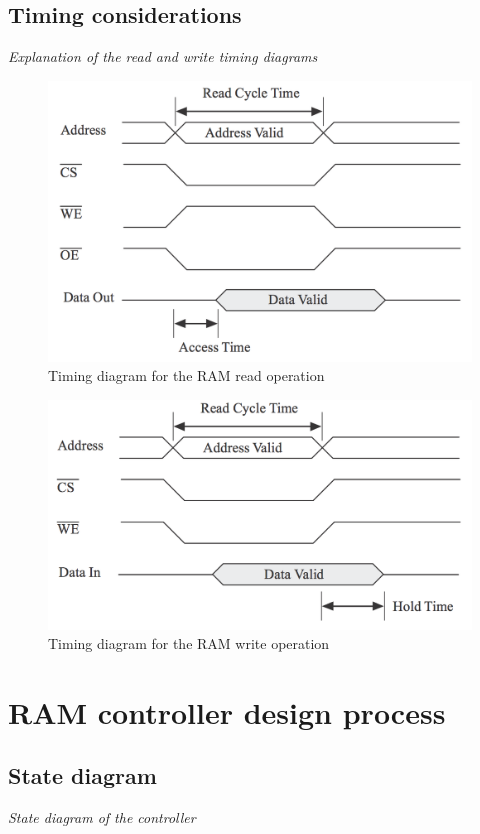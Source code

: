 \documentclass[11pt]{article}
\begin{document}
\subsection{Timing considerations}
{\em Explanation of the read and write timing diagrams}

\begin{figure}[htpb]
	\centering
	\includegraphics[scale=0.5]{read}
	\caption{Timing diagram for the RAM read operation}
	\label{fig:write-timing}
\end{figure}

\begin{figure}[htpb]
	\centering
	\includegraphics[scale=0.5]{write}
	\caption{Timing diagram for the RAM write operation}
	\label{fig:read-timing}
\end{figure}

\section{RAM controller design process}
\subsection{State diagram}
{\em State diagram of the controller}
\end{document}
